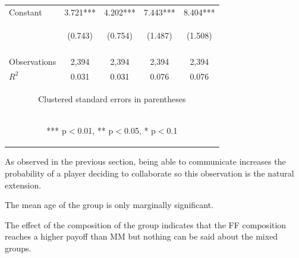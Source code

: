 \documentclass{article} %
\begin{document}
\begin{table}[H]
\begin{center}
\begin{tabular}{lcccc}
Constant & 3.721*** & 4.202*** & 7.443*** & 8.404*** \\
 & \begin{footnotesize}(0.743)\end{footnotesize} & \begin{footnotesize}(0.754)\end{footnotesize} & \begin{footnotesize}(1.487)\end{footnotesize} & \begin{footnotesize}(1.508)\end{footnotesize} \\
\vspace{4pt} & \begin{footnotesize}\end{footnotesize} & \begin{footnotesize}\end{footnotesize} & \begin{footnotesize}\end{footnotesize} & \begin{footnotesize}\end{footnotesize} \\
Observations & 2,394 & 2,394 & 2,394 & 2,394 \\
 $R^2$ & 0.031 & 0.031 & 0.076 & 0.076 \\ \hline
\multicolumn{5}{c}{\begin{footnotesize} Clustered standard errors in parentheses\end{footnotesize}} \\
\multicolumn{5}{c}{\begin{footnotesize} *** p$<$0.01, ** p$<$0.05, * p$<$0.1\end{footnotesize}} \\
\end{tabular}
\end{center}

\end{table}

As observed in the previous section, being able to communicate increases the probability of a player deciding to collaborate so this observation is the natural extension. 

The mean age of the group is only marginally significant. 

The effect of the composition of the group indicates that the FF composition reaches a higher payoff than MM but nothing can be said about the mixed groups.
\end{document}
